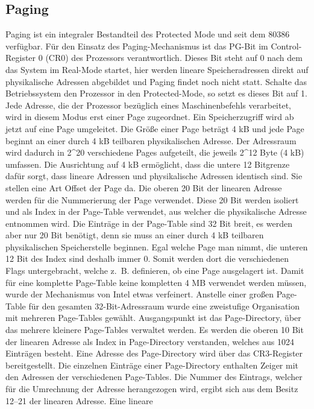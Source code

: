 ﻿\documentclass[12pt]{book}
\begin{document}
\subsection{Paging}
Paging ist ein integraler Bestandteil des Protected Mode und seit dem 80386
verfügbar. Für den Einsatz des Paging-Mechanismus ist das PG-Bit im
Control-Register 0 (CR0) des Prozessors verantwortlich. Dieses Bit steht auf 0
nach dem das System im Real-Mode startet, hier werden lineare Speicheradressen
direkt auf physikalische Adressen abgebildet und Paging findet noch nicht statt.
Schalte das Betriebssystem den Prozessor in den Protected-Mode, so setzt es
dieses Bit auf 1. Jede Adresse, die der Prozessor bezüglich eines
Maschinenbefehls verarbeitet, wird in diesem Modus erst einer Page zugeordnet.
Ein Speicherzugriff wird ab jetzt auf eine Page umgeleitet. Die Größe einer Page
beträgt 4 kB und jede Page beginnt an einer durch 4 kB teilbaren physikalischen
Adresse. Der Adressraum wird dadurch in 2^20 verschiedene Pages aufgeteilt, die
jeweils 2^12 Byte (4 kB) umfassen. Die Ausrichtung auf 4 kB ermöglicht, dass die
untere 12 Bitgrenze dafür sorgt, dass lineare Adressen und physikalische
Adressen identisch sind. Sie stellen eine Art Offset der Page da. Die oberen 20
Bit der linearen Adresse werden für die Nummerierung der Page verwendet. Diese
20 Bit werden isoliert und als Index in der Page-Table verwendet, aus welcher
die physikalische Adresse entnommen wird. Die Einträge in der Page-Table sind 32
Bit breit, es werden aber nur 20 Bit benötigt, denn sie muss an einer durch 4 kB
teilbaren physikalischen Speicherstelle beginnen. Egal welche Page man nimmt,
die unteren 12 Bit des Index sind deshalb immer 0. Somit werden dort die
verschiedenen Flags untergebracht, welche z. B. definieren, ob eine Page
ausgelagert ist. Damit für eine komplette Page-Table keine kompletten 4 MB
verwendet werden müssen, wurde der Mechanismus von Intel etwas verfeinert.
Anstelle einer großen Page-Table für den gesamten 32-Bit-Adressraum wurde eine
zweistufige Organisation mit mehreren Page-Tables gewählt. Ausgangspunkt ist das
Page-Directory, über das mehrere kleinere Page-Tables verwaltet werden. Es
werden die oberen 10 Bit der linearen Adresse als Index in Page-Directory
verstanden, welches aus 1024 Einträgen besteht. Eine Adresse des Page-Directory
wird über das CR3-Register bereitgestellt. Die einzelnen Einträge einer
Page-Directory enthalten Zeiger mit den Adressen der verschiedenen Page-Tables.
Die Nummer des Eintrags, welcher für die Umrechnung der Adresse herangezogen
wird, ergibt sich aus dem Besitz 12–21 der linearen Adresse. Eine lineare
\end{document}
